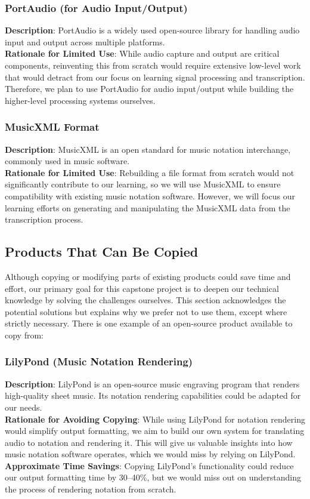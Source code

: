 \documentclass[12pt]{article}
\begin{document}
\subsubsection*{PortAudio (for Audio Input/Output)~\cite{portaudio}}
\textbf{Description}: PortAudio is a widely used open-source library for handling audio input and output across multiple platforms.\\
\textbf{Rationale for Limited Use}: While audio capture and output are critical components, reinventing this from scratch would require extensive low-level work that would detract from our focus on learning signal processing and transcription. Therefore, we plan to use PortAudio for audio input/output while building the higher-level processing systems ourselves.\\

\subsubsection*{MusicXML Format~\cite{musicxml}}
\textbf{Description}: MusicXML is an open standard for music notation interchange, commonly used in music software.\\
\textbf{Rationale for Limited Use}: Rebuilding a file format from scratch would not significantly contribute to our learning, so we will use MusicXML to ensure compatibility with existing music notation software. However, we will focus our learning efforts on generating and manipulating the MusicXML data from the transcription process.\\

\subsection{Products That Can Be Copied}
Although copying or modifying parts of existing products could save time and effort, our primary goal for this capstone project is to deepen our technical knowledge by solving the challenges ourselves. This section acknowledges the potential solutions but explains why we prefer not to use them, except where strictly necessary. There is one example of an open-source product available to copy from:\\

\subsubsection*{LilyPond (Music Notation Rendering)~\cite{lilypond}}
\textbf{Description}: LilyPond is an open-source music engraving program that renders high-quality sheet music. Its notation rendering capabilities could be adapted for our needs.\\
\textbf{Rationale for Avoiding Copying}: While using LilyPond for notation rendering would simplify output formatting, we aim to build our own system for translating audio to notation and rendering it. This will give us valuable insights into how music notation software operates, which we would miss by relying on LilyPond.\\
\textbf{Approximate Time Savings}: Copying LilyPond’s functionality could reduce our output formatting time by 30–40\%, but we would miss out on understanding the process of rendering notation from scratch.
\end{document}
